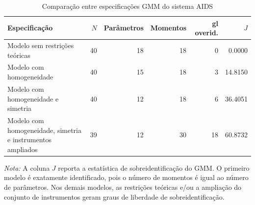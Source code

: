 \begin{table}[H]
\centering
\caption{Comparação entre especificações GMM do sistema AIDS}
\label{tab:comparacao-modelos}
\small %
\setlength{\tabcolsep}{6pt} %
\renewcommand{\arraystretch}{1.15} %
\begin{tabular}{@{}p{7.5cm}rrrrr@{}} %
\toprule
Especificação 
& \(N\) 
& Parâmetros 
& Momentos 
& gl overid. 
& \(J\) \\
\midrule
Modelo sem restrições teóricas
& 40 & 18 & 18 & 0 & 0.0000 \\

Modelo com homogeneidade
& 40 & 15 & 18 & 3 & 14.8150 \\

Modelo com homogeneidade e simetria
& 40 & 12 & 18 & 6 & 36.4051 \\

Modelo com homogeneidade, simetria e instrumentos ampliados
& 39 & 12 & 30 & 18 & 60.8732 \\
\bottomrule
\end{tabular}

\par\vspace{0.35em}
\begin{minipage}{0.95\textwidth} %
\scriptsize %
\textit{Nota:} A coluna \(J\) reporta a estatística de sobreidentificação do GMM. O primeiro modelo é exatamente identificado, pois o número de momentos é igual ao número de parâmetros. Nos demais modelos, as restrições teóricas e/ou a ampliação do conjunto de instrumentos geram graus de liberdade de sobreidentificação.
\end{minipage}
\end{table}